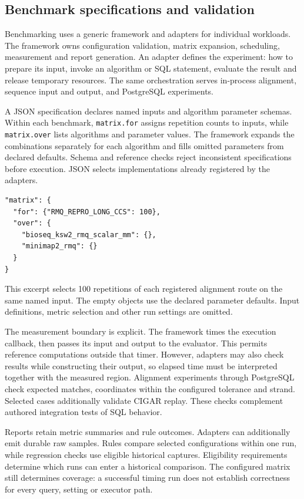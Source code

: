 \subsection{Benchmark specifications and validation}
\label{sec:arch-benchmark-specifications}

Benchmarking uses a generic framework and adapters for individual workloads.
The framework owns configuration validation, matrix expansion, scheduling,
measurement and report generation. An adapter defines the experiment: how to
prepare its input, invoke an algorithm or SQL statement, evaluate the result
and release temporary resources. The same orchestration serves in-process
alignment, sequence input and output, and PostgreSQL experiments.

A JSON specification declares named inputs and algorithm parameter schemas.
Within each benchmark, \texttt{matrix.for} assigns repetition counts to inputs,
while \texttt{matrix.over} lists algorithms and parameter values. The framework
expands the combinations separately for each algorithm and fills omitted
parameters from declared defaults. Schema and reference checks reject
inconsistent specifications before execution. JSON selects implementations
already registered by the adapters.

\noindent\begin{minipage}{\linewidth}
\begin{lstlisting}[style=bioseq-arch-code,language={},
  caption={Input and algorithm selection fields from an alignment benchmark specification.},
  label={lst:arch-benchmark-matrix}]
"matrix": {
  "for": {"RMQ_REPRO_LONG_CCS": 100},
  "over": {
    "bioseq_ksw2_rmq_scalar_mm": {},
    "minimap2_rmq": {}
  }
}
\end{lstlisting}
\end{minipage}

This excerpt selects 100 repetitions of each registered alignment route on
the same named input. The empty objects use the declared parameter defaults.
Input definitions, metric selection and other run settings are omitted.

The measurement boundary is explicit. The framework times the execution
callback, then passes its input and output to the evaluator. This permits
reference computations outside that timer. However, adapters may also check
results while constructing their output, so elapsed time must be interpreted
together with the measured region. Alignment experiments through PostgreSQL
check expected matches, coordinates within the configured tolerance and
strand. Selected cases additionally validate CIGAR replay. These checks
complement authored integration tests of SQL behavior.

Reports retain metric summaries and rule outcomes. Adapters can additionally
emit durable raw samples. Rules compare selected configurations within one
run, while regression checks use eligible historical captures. Eligibility
requirements determine which runs can enter a historical comparison.
The configured matrix still determines coverage: a successful timing run
does not establish correctness for every query, setting or executor path.
